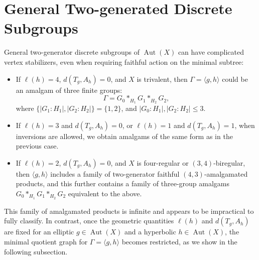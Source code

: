 \documentclass[12pt,leqno]{amsart}
\newcommand{\2}{L^2_{\rm per}(0, T)}
\newcommand{\aut}{{\operatorname{Aut}}}
\numberwithin{equation}{section}
\numberwithin{figure}{section}
\begin{document}
\section{General Two-generated Discrete Subgroups}\label{sec:flex}
General two-generator discrete subgroups of $\aut(X)$ can have complicated vertex stabilizers, even when requiring faithful action on the minimal subtree:
\begin{itemize}
    \item If $\ell(h) = 4$, $d(T_g,A_h) = 0$, and $X$ is trivalent, then $\Gamma = \langle g,h\rangle$ could be an amalgam of three finite groups:
    \[
    \Gamma = G_0 *_{H_1} G_1*_{H_2} G_2,
    \]
    where $\{\lvert G_1:H_1\rvert, \lvert G_2:H_2\rvert\} = \{1,2\}$, and $\lvert G_0:H_1\rvert,\lvert G_2:H_2\rvert\leq 3$.
    \item If $\ell(h) = 3$ and $d(T_g,A_h) = 0$, or $\ell(h) = 1$ and $d(T_g, A_h) = 1$, when inversions are allowed, we obtain amalgams of the same form as in the previous case.
    \item If $\ell(h) = 2$, $d(T_g,A_h) = 0$, and $X$ is four-regular or $(3,4)$-biregular, then $\langle g,h\rangle$ includes a family of two-generator faithful $(4,3)$-amalgamated products, and this further contains a family of three-group amalgams $G_0 *_{H_1} G_1*_{H_2} G_2$ equivalent to the above.
    \end{itemize}
This family of amalgamated products is infinite and appears to be impractical to fully classify. In contrast, once the geometric quantities $\ell(h)$ and $d(T_g,A_h)$ are fixed for an elliptic $g\in\aut(X)$ and a hyperbolic $h\in\aut(X)$, the minimal quotient graph for $\Gamma = \langle g,h\rangle$ becomes restricted, as we show in the following subsection.
\end{document}
